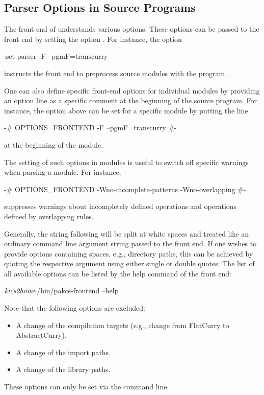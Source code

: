\subsection{Parser Options in Source Programs}

The front end of \CYS understands various options.
These options can be passed to the front end by setting
the \CYS option .
For instance, the option
%
\begin{curry}
:set parser -F --pgmF=transcurry
\end{curry}
%
instructs the front end to preprocess source modules with
the program .

One can also define specific front-end options
for individual modules by providing an option line as a specific
comment at the beginning of the source program.
For instance, the option above can be set for a specific module
by putting the line
%
\begin{curry}
{-# OPTIONS_FRONTEND -F --pgmF=transcurry #-}
\end{curry}
%
at the beginning of the module.

The setting of such options in modules
is useful to switch off specific warnings when parsing a module.
For instance, 
%
\begin{curry}
{-# OPTIONS_FRONTEND -Wno-incomplete-patterns -Wno-overlapping #-}
\end{curry}
%
suppresses warnings about incompletely defined operations
and operations defined by overlapping rules.

Generally, the string following 
will be split at white spaces and treated like an ordinary
command line argument string passed to the front end.
If one wishes to provide options containing spaces, e.g., directory paths,
this can be achieved by quoting the respective argument
using either single or double quotes.
The list of all available options can be listed by the help command
of the front end:
\begin{curry}
$\mbox{\textit{kics2home}}$/bin/pakcs-frontend --help
\end{curry}
%
Note that the following options are excluded:
\begin{itemize}
\item A change of the compilation targets
      (e.g., change from FlatCurry to AbstractCurry).
\item A change of the import  paths.
\item A change of the library paths.
\end{itemize}
%
These options can only be set via the command line.


